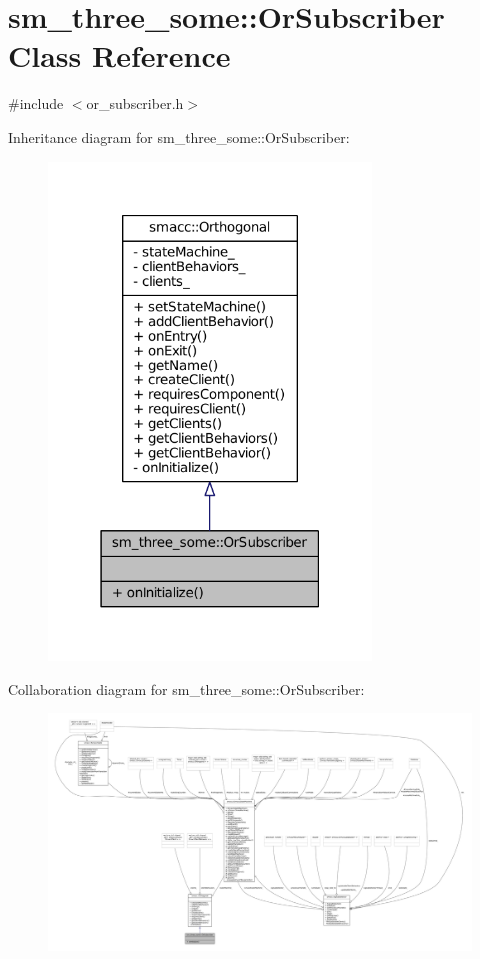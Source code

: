 \hypertarget{classsm__three__some_1_1OrSubscriber}{}\section{sm\+\_\+three\+\_\+some\+:\+:Or\+Subscriber Class Reference}
\label{classsm__three__some_1_1OrSubscriber}


{\ttfamily \#include $<$or\+\_\+subscriber.\+h$>$}



Inheritance diagram for sm\+\_\+three\+\_\+some\+:\+:Or\+Subscriber\+:
\nopagebreak
\begin{figure}[H]
\begin{center}
\leavevmode
\includegraphics[width=243pt]{classsm__three__some_1_1OrSubscriber__inherit__graph}
\end{center}
\end{figure}


Collaboration diagram for sm\+\_\+three\+\_\+some\+:\+:Or\+Subscriber\+:
\nopagebreak
\begin{figure}[H]
\begin{center}
\leavevmode
\includegraphics[width=350pt]{classsm__three__some_1_1OrSubscriber__coll__graph}
\end{center}
\end{figure}
